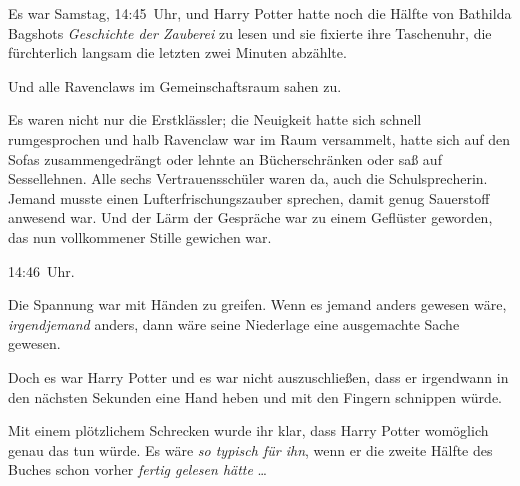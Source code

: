 Es war Samstag, 14:45~Uhr, und Harry Potter hatte noch die Hälfte von Bathilda Bagshots \emph{Geschichte der Zauberei} zu lesen und sie fixierte ihre Taschenuhr, die fürchterlich langsam die letzten zwei Minuten abzählte.

Und alle Ravenclaws im Gemeinschaftsraum sahen zu.

Es waren nicht nur die Erstklässler; die Neuigkeit hatte sich schnell rumgesprochen und halb Ravenclaw war im Raum versammelt, hatte sich auf den Sofas zusammengedrängt oder lehnte an Bücherschränken oder saß auf Sessellehnen. Alle sechs Vertrauensschüler waren da, auch die Schulsprecherin. Jemand musste einen Lufterfrischungszauber sprechen, damit genug Sauerstoff anwesend war. Und der Lärm der Gespräche war zu einem Geflüster geworden, das nun vollkommener Stille gewichen war.

14:46~Uhr.

Die Spannung war mit Händen zu greifen. Wenn es jemand anders gewesen wäre, \emph{irgendjemand} anders, dann wäre seine Niederlage eine ausgemachte Sache gewesen.

Doch es war Harry Potter und es war nicht auszuschließen, dass er irgendwann in den nächsten Sekunden eine Hand heben und mit den Fingern schnippen würde.

Mit einem plötzlichem Schrecken wurde ihr klar, dass Harry Potter womöglich genau das tun würde. Es wäre \emph{so typisch für ihn}, wenn er die zweite Hälfte des Buches schon vorher \emph{fertig gelesen hätte} …

